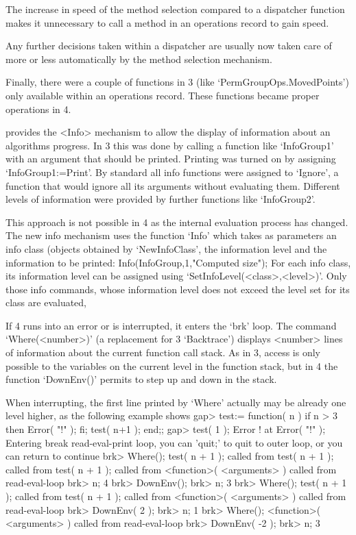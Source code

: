 \enditems

The increase in speed of the method selection compared to a dispatcher
function makes it unnecessary to call a method in an operations record
to gain speed.

Any further decisions taken within a dispatcher are usually now taken care of
more or less automatically by the method selection mechanism.

Finally, there were a couple of functions in {\GAP}3 (like
`PermGroupOps.MovedPoints') only available within an operations record.
These functions became proper operations in {\GAP}4.


{\GAP} provides the <Info> mechanism to allow the display of information
about an algorithms progress. In {\GAP}3 this was done by calling a function
like `InfoGroup1' with an argument that should be printed. 
Printing was turned on by assigning `InfoGroup1:=Print'. By standard all
info functions were assigned to `Ignore', a function that would ignore all
its arguments without evaluating them. Different levels of information were
provided by further functions like `InfoGroup2'.

This approach is not possible in {\GAP}4 as the internal evaluation process
has changed. The new info mechanism uses the function `Info' which takes as
parameters an info class (objects obtained by `NewInfoClass', the information
level and the information to be printed:
\begintt
Info(InfoGroup,1,"Computed size");
\endtt
For each info class, its information level can be assigned using
`SetInfoLevel(<class>,<level>)'. Only those info commands,
whose information level does not exceed the level set for its class
are evaluated,


If {\GAP}4 runs into an error or is interrupted, it enters the `brk' loop.
The command `Where(<number>)' (a replacement for {\GAP}3 `Backtrace')
displays <number> lines of information about the current function call stack.
As in {\GAP}3, access is only possible to the variables on the current level
in the function stack, but in {\GAP}4 the function `DownEnv()' permits to
step up and down in the stack.

When interrupting, the first line printed by `Where' actually may be already
one level higher, as the following example shows
\begintt
gap> test:= function( n ) if n > 3 then Error( "!" ); fi; test( n+1 ); end;;
gap> test( 1 );
Error ! at
Error( "!" );
Entering break read-eval-print loop,
you can 'quit;' to quit to outer loop,
or you can return to continue
brk> Where();
test( n + 1 ); called from
test( n + 1 ); called from
test( n + 1 ); called from
<function>( <arguments> ) called from read-eval-loop
brk> n;
4
brk> DownEnv();
brk> n;
3
brk> Where();
test( n + 1 ); called from
test( n + 1 ); called from
<function>( <arguments> ) called from read-eval-loop
brk> DownEnv( 2 );
brk> n;
1
brk> Where();
<function>( <arguments> ) called from read-eval-loop
brk> DownEnv( -2 );
brk> n;
3
\endtt

